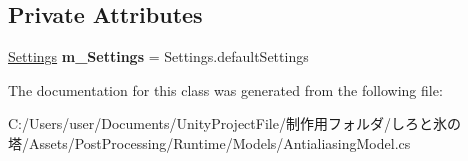 \subsection*{Private Attributes}
\begin{DoxyCompactItemize}
\item 
\mbox{\label{class_unity_engine_1_1_post_processing_1_1_antialiasing_model_ad01f0f77c42f9b907b998a7d8fcbe58f}} 
\hyperlink{struct_unity_engine_1_1_post_processing_1_1_antialiasing_model_1_1_settings}{Settings} {\bfseries m\+\_\+\+Settings} = Settings.\+default\+Settings
\end{DoxyCompactItemize}


The documentation for this class was generated from the following file\+:\begin{DoxyCompactItemize}
\item 
C\+:/\+Users/user/\+Documents/\+Unity\+Project\+File/制作用フォルダ/しろと氷の塔/\+Assets/\+Post\+Processing/\+Runtime/\+Models/Antialiasing\+Model.\+cs\end{DoxyCompactItemize}

